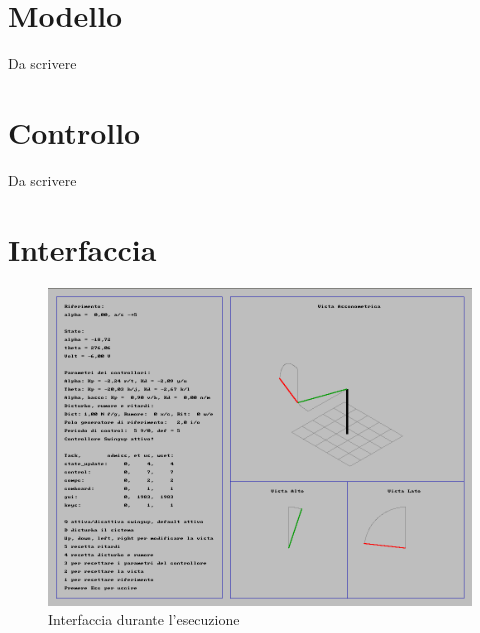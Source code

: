 \section{Modello}
Da scrivere

\section{Controllo}
Da scrivere

\section{Interfaccia}
\begin{figure}
	\centering
	\includegraphics[height=.4\textheight]{interfaccia_in_esecuzione.png}
	\caption{Interfaccia durante l'esecuzione}
	\label{fig:interfaccia_in_esecuzione}
\end{figure}

